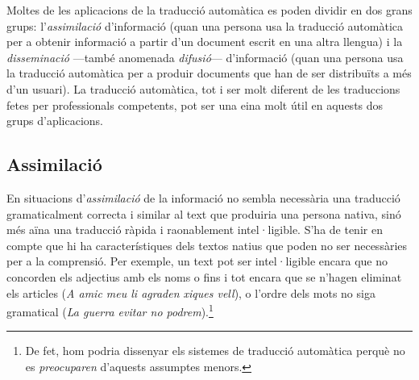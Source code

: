



Moltes de les aplicacions de la traducció automàtica es poden dividir
en dos grans grups: l'\emph{assimilació} d'informació (quan una
persona usa la traducció automàtica per a obtenir informació a partir
d'un document escrit en una altra llengua) i la \emph{disseminació}
---també anomenada \emph{difusió}--- d'informació (quan una persona
usa la traducció automàtica per a produir documents que han de ser
distribuïts a més d'un usuari).  La traducció automàtica, tot i ser
molt diferent de les traduccions fetes per professionals competents,
pot ser una eina molt útil en aquests dos grups d'aplicacions.

\subsection{Assimilació} 
\label{s3:assim}
En situacions d'\emph{assimilació} de la informació no sembla
necessària una traducció gramaticalment correcta i similar al text que
produiria una persona nativa, sinó més aïna una traducció ràpida i
raonablement intel·ligible. S'ha de tenir en compte que hi ha
característiques dels textos natius que poden no ser necessàries per a
la comprensió. Per exemple, un text pot ser intel·ligible encara que
no concorden els adjectius amb els noms o fins i tot encara que se
n'hagen eliminat els articles (\emph{A amic meu li agraden xiques
  vell}), o l'ordre dels mots no siga gramatical (\emph{La guerra
  evitar no podrem}).\footnote{De fet, hom podria dissenyar els
  sistemes de traducció automàtica perquè no es \emph{preocuparen}
  d'aquests assumptes menors.}


